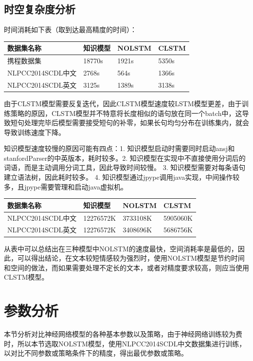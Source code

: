 \subsection{时空复杂度分析}
时间消耗如下表（取到达最高精度的时间）：\par
\begin{center}
\begin{longtabu} to \textwidth{X|X|X|X} 
\hline
数据集名称 & 知识模型 & NOLSTM & CLSTM
\\\hline
携程数据集 & 18770s & 1921s & 5350s %
\\\hline
NLPCC2014SCDL中文 & 2768s & 564s & 1366s %
\\\hline
NLPCC2014SCDL英文 & 3125s & 1389s & 3138s %
\\\hline
\end{longtabu}
\end{center}
\par
由于CLSTM模型需要反复迭代，因此CLSTM模型速度较LSTM模型更差，由于训练策略的原因，CLSTM模型并不特意将长度相似的语句放在同一个batch中，这导致短句处理完毕后模型需要接受短句的补零，如果长句均匀分布在训练集内，就会导致训练速度下降。\par
知识模型速度较慢的原因可能有四点：1. 知识模型启动时需要同时启动ansj和stanfordParser的中英版本，耗时较多。2. 知识模型在实现中不直接使用分词后的词语，而是主动调用分词工具，因此导致时间较慢。 3. 知识模型需要对每条语句建立语法树，因此耗时较多。 4. 知识模型通过jpype调用java实现，中间操作较多，且jpype需要管理和启动java虚拟机。\par
\begin{center}
\begin{longtabu} to \textwidth{X|X|X|X}
\hline
数据集名称 & 知识模型 & NOLSTM & CLSTM \\
\hline
NLPCC2014SCDL中文 & 12276572K & 3733108K & 5905060K \\
\hline
NLPCC2014SCDL英文 & 12276572K & 3408696K & 5686756K
\\\hline
\end{longtabu}
\end{center}


从表中可以总结出在三种模型中NOLSTM的速度最快，空间消耗率是最低的，因此，可以得出结论，在文本较短情感较为强烈时，使用NOLSTM模型是节约时间和空间的做法，而如果需要处理不定长的文本，或者对精度要求较高，则应当使用CLSTM模型。\par
\section{参数分析}
本节分析对比神经网络模型的各种基本参数以及策略，由于神经网络训练较为费时，所以本节选取NOLSTM模型，使用NLPCC2014SCDL中文数据集进行训练，以对比不同参数或策略条件下的精度，得出最优参数或策略。
